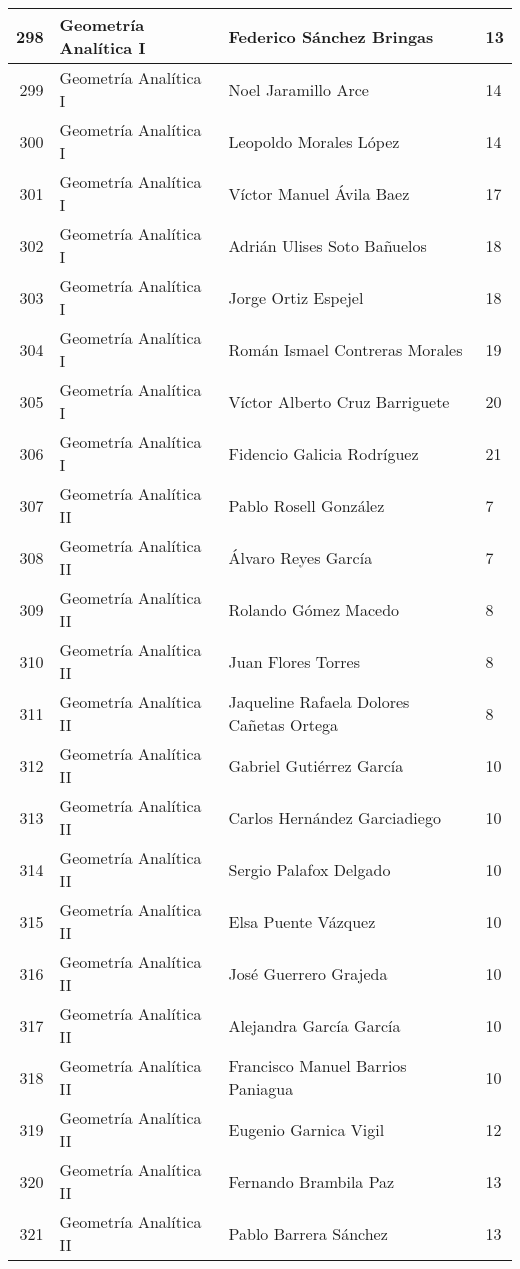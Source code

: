 \begin{table}[ht]
\begin{tabular}{rlll}
  298 & Geometría Analítica I & Federico Sánchez Bringas & 13 \\ \hline
  299 & Geometría Analítica I & Noel Jaramillo Arce & 14 \\ \hline
  300 & Geometría Analítica I & Leopoldo Morales López & 14 \\ \hline
  301 & Geometría Analítica I & Víctor Manuel Ávila Baez & 17 \\ \hline
  302 & Geometría Analítica I & Adrián Ulises Soto Bañuelos & 18 \\ \hline
  303 & Geometría Analítica I & Jorge Ortiz Espejel & 18 \\ \hline
  304 & Geometría Analítica I & Román Ismael Contreras Morales & 19 \\ \hline
  305 & Geometría Analítica I & Víctor Alberto Cruz Barriguete & 20 \\ \hline
  306 & Geometría Analítica I & Fidencio Galicia Rodríguez & 21 \\ \hline
  307 & Geometría Analítica II & Pablo Rosell González & 7 \\ \hline
  308 & Geometría Analítica II & Álvaro Reyes García & 7 \\ \hline
  309 & Geometría Analítica II & Rolando Gómez Macedo & 8 \\ \hline
  310 & Geometría Analítica II & Juan Flores Torres & 8 \\ \hline
  311 & Geometría Analítica II & Jaqueline Rafaela Dolores Cañetas Ortega & 8 \\ \hline
  312 & Geometría Analítica II & Gabriel Gutiérrez García & 10 \\ \hline
  313 & Geometría Analítica II & Carlos Hernández Garciadiego & 10 \\ \hline
  314 & Geometría Analítica II & Sergio Palafox Delgado & 10 \\ \hline
  315 & Geometría Analítica II & Elsa Puente Vázquez & 10 \\ \hline
  316 & Geometría Analítica II & José Guerrero Grajeda & 10 \\ \hline
  317 & Geometría Analítica II & Alejandra García García & 10 \\ \hline
  318 & Geometría Analítica II & Francisco Manuel Barrios Paniagua & 10 \\ \hline
  319 & Geometría Analítica II & Eugenio Garnica Vigil & 12 \\ \hline
  320 & Geometría Analítica II & Fernando Brambila Paz & 13 \\ \hline
  321 & Geometría Analítica II & Pablo Barrera Sánchez & 13 \\ \hline

\end{tabular}
\end{table}

